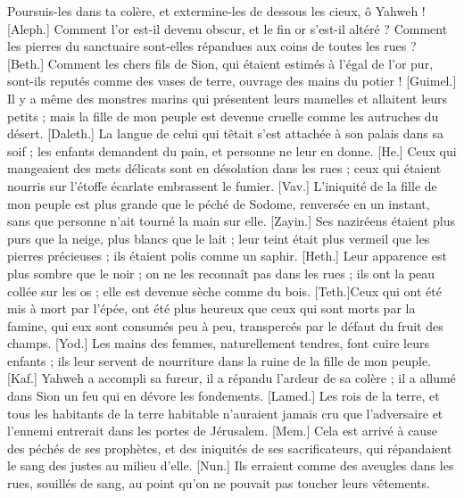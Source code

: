 \begin{multicols}{2}
Poursuis-les dans ta colère, et extermine-les de dessous les cieux, ô Yahweh !
\VerseOne{}[Aleph.] Comment l'or est-il devenu obscur, et le fin or s'est-il altéré ? Comment les pierres du sanctuaire sont-elles répandues aux coins de toutes les rues ?
[Beth.] Comment les chers fils de Sion, qui étaient estimés à l'égal de l'or pur, sont-ils reputés comme des vases de terre, ouvrage des mains du potier !
[Guimel.] Il y a même des monstres marins qui présentent leurs mamelles et allaitent leurs petits ; mais la fille de mon peuple est devenue cruelle comme les autruches du désert.
[Daleth.] La langue de celui qui têtait s'est attachée à son palais dans sa soif ; les enfants demandent du pain, et personne ne leur en donne.
[He.] Ceux qui mangeaient des mets délicats sont en désolation dans les rues ; ceux qui étaient nourris sur l'étoffe écarlate embrassent le fumier.
[Vav.] L'iniquité de la fille de mon peuple est plus grande que le péché de Sodome, renversée en un instant, sans que personne n'ait tourné la main sur elle.
[Zayin.] Ses naziréens étaient plus purs que la neige, plus blancs que le lait ; leur teint était plus vermeil que les pierres précieuses ; ils étaient polis comme un saphir.
[Heth.] Leur apparence est plus sombre que le noir ; on ne les reconnaît pas dans les rues ; ils ont la peau collée sur les os ; elle est devenue sèche comme du bois.
[Teth.]Ceux qui ont été mis à mort par l'épée, ont été plus heureux que ceux qui sont morts par la famine, qui eux sont consumés peu à peu, transpercés par le défaut du fruit des champs.
[Yod.] Les mains des femmes, naturellement tendres, font cuire leurs enfants ; ils leur servent de nourriture dans la ruine de la fille de mon peuple.
[Kaf.] Yahweh a accompli sa fureur, il a répandu l'ardeur de sa colère ; il a allumé dans Sion un feu qui en dévore les fondements.
[Lamed.] Les rois de la terre, et tous les habitants de la terre habitable n'auraient jamais cru que l'adversaire et l'ennemi entrerait dans les portes de Jérusalem.
[Mem.] Cela est arrivé à cause des péchés de ses prophètes, et des iniquités de ses sacrificateurs, qui répandaient le sang des justes au milieu d'elle.
[Nun.] Ils erraient comme des aveugles dans les rues, souillés de sang, au point qu'on ne pouvait pas toucher leurs vêtements.

\end{multicols}
